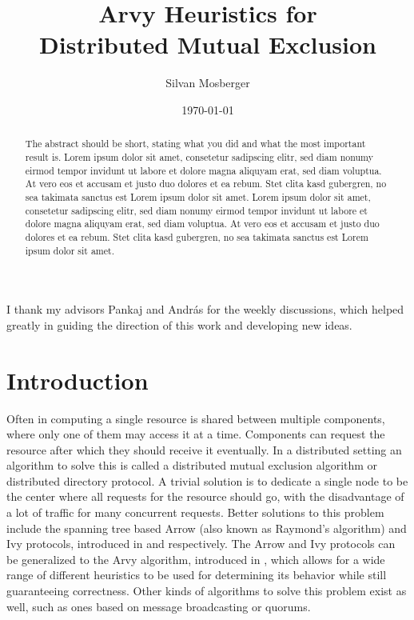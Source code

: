 \documentclass[a4paper, oneside]{discothesis}
\title{Arvy Heuristics for \\Distributed Mutual Exclusion}
\author{Silvan Mosberger}
\institute{Distributed Computing Group \\[2pt]
Computer Engineering and Networks Laboratory \\[2pt]
ETH Zürich}
\date{\today}
\begin{document}
\frontmatter
\maketitle

\cleardoublepage

\begin{acknowledgements}
I thank my advisors Pankaj and András for the weekly discussions, which helped greatly in guiding the direction of this work and developing new ideas.
\end{acknowledgements}


\begin{abstract}
The abstract should be short, stating what you did and what the most important result is.
Lorem ipsum dolor sit amet, consetetur sadipscing elitr, sed diam nonumy eirmod tempor invidunt ut labore et dolore magna aliquyam erat, sed diam voluptua. At vero eos et accusam et justo duo dolores et ea rebum. Stet clita kasd gubergren, no sea takimata sanctus est Lorem ipsum dolor sit amet. Lorem ipsum dolor sit amet, consetetur sadipscing elitr, sed diam nonumy eirmod tempor invidunt ut labore et dolore magna aliquyam erat, sed diam voluptua. At vero eos et accusam et justo duo dolores et ea rebum. Stet clita kasd gubergren, no sea takimata sanctus est Lorem ipsum dolor sit amet.
\end{abstract}

\tableofcontents

\mainmatter

\chapter{Introduction}

Often in computing a single resource is shared between multiple components, where only one of them may access it at a time. Components can request the resource after which they should receive it eventually. In a distributed setting an algorithm to solve this is called a distributed mutual exclusion algorithm or distributed directory protocol. A trivial solution is to dedicate a single node to be the center where all requests for the resource should go, with the disadvantage of a lot of traffic for many concurrent requests. Better solutions to this problem include the spanning tree based Arrow (also known as Raymond's algorithm) and Ivy protocols, introduced in \cite{Ray} and \cite{Ivy} respectively. The Arrow and Ivy protocols can be generalized to the Arvy algorithm, introduced in \cite{Arvy}, which allows for a wide range of different heuristics to be used for determining its behavior while still guaranteeing correctness. Other kinds of algorithms to solve this problem exist as well, such as ones based on message broadcasting or quorums.
\end{document}
